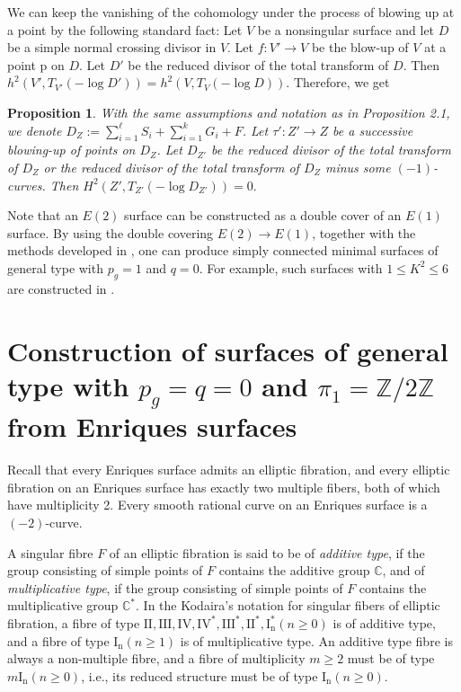 \documentclass[twoside,11pt]{amsart}
\newtheorem{proposition}{Proposition}[section]
\begin{document}
We can keep the vanishing of the cohomology under the process of
blowing up at a point by the following standard fact: Let $V$ be a
nonsingular surface and let $D$ be a simple normal crossing
divisor in $V$. Let $f: V'\to V$ be the blow-up of $V$ at a point
p on $D$. Let  $D'$ be the reduced divisor of the total transform
of $D$. Then $h^2(V',T_{V'}(-{\operatorname{log}} D'))=h^2(V, T_V(-{\operatorname{log}} D))$.
Therefore, we get

\begin{proposition}
\label{prop 2.2} With the same assumptions and notation as in
Proposition 2.1, we denote $D_Z:=\sum_{i=1}^\ell S_i +\sum_{i=1}^k
G_i+F$. Let $\tau': Z'\to Z$ be a successive blowing-up of points
on $D_Z$. Let $D_{Z'}$ be the reduced divisor of the total
transform of $D_Z$ or the reduced divisor of the total transform
of  $D_Z$ minus some $(-1)$-curves. Then $H^2(Z', T_{Z'}(-{\operatorname{log}}
D_{Z'}))=0.$
\end{proposition}

Note that an $E(2)$ surface can be constructed as a double cover of
an $E(1)$ surface. By using the double covering $E(2)\to E(1)$,
together with the methods developed in \cite{LP1}, one can produce
simply connected minimal surfaces of general type with $p_g=1$ and
$q=0$. For example, such surfaces with $1\le K^2\le 6$ are
constructed in \cite{PPS4}.

\section{Construction of surfaces of general type
with $p_g=q=0$ and $\pi_1={{\mathbb Z}}/2{{\mathbb Z}}$ from Enriques surfaces}
\label{sec-3}

Recall that every Enriques surface admits an elliptic fibration,
and every elliptic fibration on an Enriques surface has exactly
two multiple fibers, both of which have multiplicity 2. Every
smooth rational curve on an Enriques surface is a $(-2)$-curve.

A singular fibre $F$ of an elliptic fibration is said to be of {\it
additive type}, if the group consisting of simple points of $F$
contains the additive group ${{\mathbb C}}$, and of {\it multiplicative type},
if the group consisting of simple points of $F$ contains the
multiplicative group ${{\mathbb C}}^*$. In the Kodaira's notation for singular
fibers of elliptic fibration, a fibre of type $\mathrm{II, III, IV,
IV^*, III^*, II^*, I_n^*} (n\geq 0)$ is of additive type, and a
fibre of type $\mathrm{I_n} (n\geq 1)$ is of multiplicative type. An
additive type fibre is always a non-multiple fibre, and a fibre of
multiplicity $m\ge 2$ must be of type $m\mathrm{I_n} (n\geq 0)$,
i.e., its reduced structure must be of type $\mathrm{I_n} (n\geq
0)$.
\end{document}
